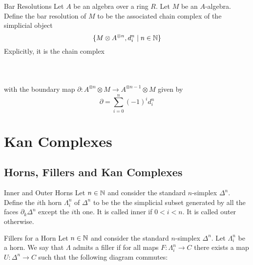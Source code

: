 \documentclass[a4paper]{article}
\begin{document}
\begin{defn}{Bar Resolutions}{} Let $A$ be an algebra over a ring $R$. Let $M$ be an $A$-algebra. Define the bar resolution of $M$ to be the associated chain complex of the simplicial object $$\{M\otimes A^{\otimes n},d_i^n\;|\;n\in\mathbb{N}\}$$ Explicitly, it is the chain complex \\~\\
\\~\\
with the boundary map $\partial:A^{\otimes n}\otimes M\to A^{\otimes n-1}\otimes M$ given by $$\partial=\sum_{i=0}^n(-1)^id_i^n$$
\end{defn}

\pagebreak
\section{Kan Complexes}
\subsection{Horns, Fillers and Kan Complexes}
\begin{defn}{Inner and Outer Horns}{} Let $n\in\mathbb{N}$ and consider the standard $n$-simplex $\Delta^n$. Define the $i$th horn $\Lambda_i^n$ of $\Delta^n$ to be the the simplicial subset generated by all the faces $\partial_k\Delta^n$ except the $i$th one. It is called inner if $0<i<n$. It is called outer otherwise. 
\end{defn}

\begin{defn}{Fillers for a Horn}{} Let $n\in\mathbb{N}$ and consider the standard $n$-simplex $\Delta^n$. Let $\Lambda_i^n$ be a horn. We say that $\Lambda$ admits a filler if for all maps $F:\Lambda_i^n\to C$ there exists a map $U:\Delta^n\to C$ such that the following diagram commutes: \\~\\
\end{defn}
\end{document}
